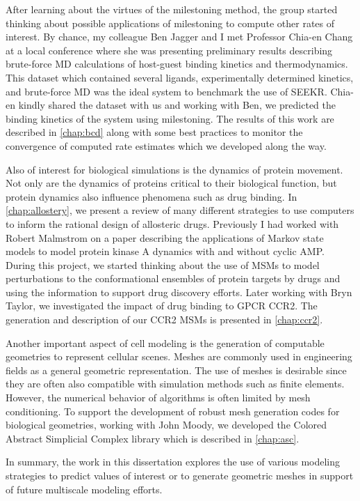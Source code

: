 \par After learning about the virtues of the milestoning method, the group started thinking about possible applications of milestoning to compute other rates of interest.
By chance, my colleague Ben Jagger and I met Professor Chia-en Chang at a local conference where she was presenting preliminary results describing brute-force MD calculations of host-guest binding kinetics and thermodynamics\cite{Tang2017}.
This dataset which contained several ligands, experimentally determined kinetics, and brute-force MD was the ideal system to benchmark the use of SEEKR\cite{Votapka2017c}.
Chia-en kindly shared the dataset with us and working with Ben, we predicted the binding kinetics of the system using milestoning.
The results of this work are described in \cref{chap:bcd} along with some best practices to monitor the convergence of computed rate estimates which we developed along the way.

\par Also of interest for biological simulations is the dynamics of protein movement.
Not only are the dynamics of proteins critical to their biological function, but protein dynamics also influence phenomena such as drug binding.
In \cref{chap:allostery}, we present a review of many different strategies to use computers to inform the rational design of allosteric drugs.
Previously I had worked with Robert Malmstrom on a paper describing the applications of Markov state models to model protein kinase A dynamics with and without cyclic AMP\cite{Malmstrom2015a}.
During this project, we started thinking about the use of MSMs to model perturbations to the conformational ensembles of protein targets by drugs and using the information to support drug discovery efforts.
Later working with Bryn Taylor, we investigated the impact of drug binding to GPCR CCR2.
The generation and description of our CCR2 MSMs is presented in \cref{chap:ccr2}.

\par Another important aspect of cell modeling is the generation of computable geometries to represent cellular scenes.
Meshes are commonly used in engineering fields as a general geometric representation.
The use of meshes is desirable since they are often also compatible with simulation methods such as finite elements.
However, the numerical behavior of algorithms is often limited by mesh conditioning.
To support the development of robust mesh generation codes for biological geometries, working with John Moody, we developed the Colored Abstract Simplicial Complex library which is described in \cref{chap:asc}.

\par In summary, the work in this dissertation explores the use of various modeling strategies to predict values of interest or to generate geometric meshes in support of future multiscale modeling efforts.

